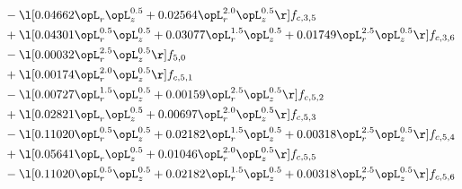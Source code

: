 \begin{alignat}{2}
& - \l[  0.04662 \opL_r \opL_z^{0.5} +  0.02564 \opL_r^{2.0} \opL_z^{0.5}  \r] f_{c,3,5} \nonumber \\ 
& + \l[  0.04301 \opL_r^{0.5} \opL_z^{0.5} +  0.03077 \opL_r^{1.5} \opL_z^{0.5} +  0.01749 \opL_r^{2.5} \opL_z^{0.5}  \r] f_{c,3,6} \nonumber \\ 
& - \l[  0.00032 \opL_r^{2.5} \opL_z^{0.5}  \r] f_{5,0} \nonumber \\ 
& + \l[  0.00174 \opL_r^{2.0} \opL_z^{0.5}  \r] f_{c,5,1} \nonumber \\ 
& - \l[  0.00727 \opL_r^{1.5} \opL_z^{0.5} +  0.00159 \opL_r^{2.5} \opL_z^{0.5}  \r] f_{c,5,2} \nonumber \\ 
& + \l[  0.02821 \opL_r \opL_z^{0.5} +  0.00697 \opL_r^{2.0} \opL_z^{0.5}  \r] f_{c,5,3} \nonumber \\ 
& - \l[  0.11020 \opL_r^{0.5} \opL_z^{0.5} +  0.02182 \opL_r^{1.5} \opL_z^{0.5} +  0.00318 \opL_r^{2.5} \opL_z^{0.5}  \r] f_{c,5,4} \nonumber \\ 
& + \l[  0.05641 \opL_r \opL_z^{0.5} +  0.01046 \opL_r^{2.0} \opL_z^{0.5}  \r] f_{c,5,5} \nonumber \\ 
& - \l[  0.11020 \opL_r^{0.5} \opL_z^{0.5} +  0.02182 \opL_r^{1.5} \opL_z^{0.5} +  0.00318 \opL_r^{2.5} \opL_z^{0.5}  \r] f_{c,5,6} \nonumber \\ 
\end{alignat} 


